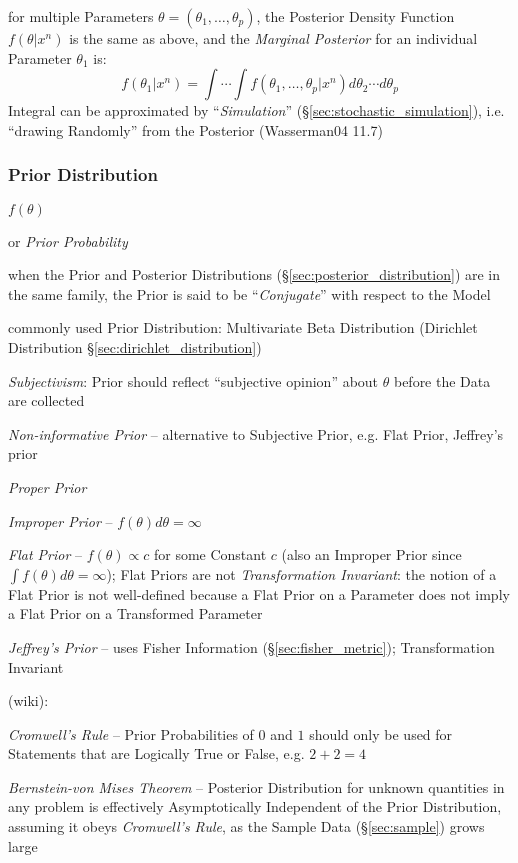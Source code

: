for multiple Parameters $\theta = (\theta_1, \ldots, \theta_p)$, the Posterior
Density Function $f(\theta|x^n)$ is the same as above, and the \emph{Marginal
  Posterior} for an individual Parameter $\theta_1$ is:
\[
  f(\theta_1 | x^n) =
    \int\cdots\int f(\theta_1,\ldots,\theta_p | x^n) d\theta_2 \cdots d\theta_p
\]
Integral can be approximated by ``\emph{Simulation}''
(\S\ref{sec:stochastic_simulation}), i.e. ``drawing Randomly'' from the
Posterior (Wasserman04 11.7)



\subsubsection{Prior Distribution}\label{sec:prior_distribution}

$f(\theta)$

or \emph{Prior Probability}

when the Prior and Posterior Distributions (\S\ref{sec:posterior_distribution})
are in the same family, the Prior is said to be ``\emph{Conjugate}'' with
respect to the Model

commonly used Prior Distribution: Multivariate Beta Distribution (Dirichlet
Distribution \S\ref{sec:dirichlet_distribution})

\emph{Subjectivism}: Prior should reflect ``subjective opinion'' about $\theta$
before the Data are collected

\emph{Non-informative Prior} -- alternative to Subjective Prior, e.g. Flat
Prior, Jeffrey's prior

\emph{Proper Prior}

\emph{Improper Prior} -- $f(\theta) d\theta = \infty$

\emph{Flat Prior} -- $f(\theta) \propto c$ for some Constant $c$ (also an
Improper Prior since $\int f(\theta) d\theta = \infty$); Flat Priors are not
\emph{Transformation Invariant}: the notion of a Flat Prior is not well-defined
because a Flat Prior on a Parameter does not imply a Flat Prior on a Transformed
Parameter

\emph{Jeffrey's Prior} -- uses Fisher Information (\S\ref{sec:fisher_metric});
Transformation Invariant

(wiki):

\emph{Cromwell's Rule} -- Prior Probabilities of $0$ and $1$ should only be used
for Statements that are Logically True or False, e.g. $2+2 = 4$

\emph{Bernstein-von Mises Theorem} -- Posterior Distribution for unknown
quantities in any problem is effectively Asymptotically Independent of the Prior
Distribution, assuming it obeys \emph{Cromwell's Rule}, as the Sample Data
(\S\ref{sec:sample}) grows large

